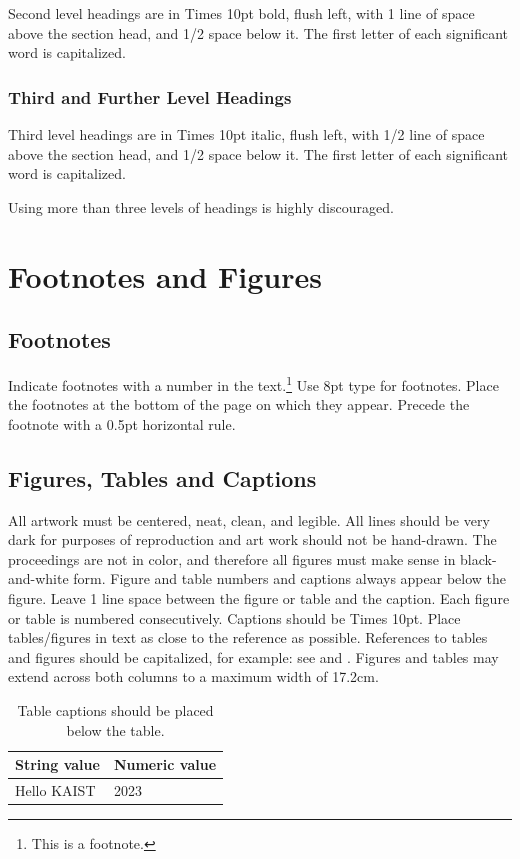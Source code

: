 \documentclass{article}
\begin{document}
Second level headings are in Times 10pt bold, flush left,
with 1 line of space above the section head, and 1/2 space below it.
The first letter of each significant word is capitalized.

\subsubsection{Third and Further Level Headings}

Third level headings are in Times 10pt italic, flush left,
with 1/2 line of space above the section head, and 1/2 space below it.
The first letter of each significant word is capitalized.

Using more than three levels of headings is highly discouraged.

\section{Footnotes and Figures}

\subsection{Footnotes}

Indicate footnotes with a number in the text.\footnote{This is a footnote.}
Use 8pt type for footnotes. Place the footnotes at the bottom of the page on which they appear.
Precede the footnote with a 0.5pt horizontal rule.

\subsection{Figures, Tables and Captions}

All artwork must be centered, neat, clean, and legible.
All lines should be very dark for purposes of reproduction and art work should not be hand-drawn.
The proceedings are not in color, and therefore all figures must make sense in black-and-white form.
Figure and table numbers and captions always appear below the figure.
Leave 1 line space between the figure or table and the caption.
Each figure or table is numbered consecutively. Captions should be Times 10pt.
Place tables/figures in text as close to the reference as possible.
References to tables and figures should be capitalized, for example:
see  and .
Figures and tables may extend across both columns to a maximum width of 17.2cm.

\begin{table}
 \begin{center}
 \begin{tabular}{|l|l|}
  \hline
  String value & Numeric value \\
  \hline
  Hello KAIST  & 2023 \\
  \hline
 \end{tabular}
\end{center}
 \caption{Table captions should be placed below the table.}
 \label{tab:example}
\end{table}
\end{document}
